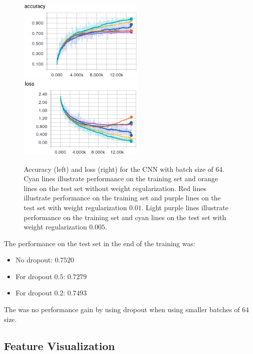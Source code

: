 \documentclass{article}
\begin{document}
\begin{figure}[h!]
\centering
\includegraphics[height=4.0cm]{acc-linear-64-drop.png}\
\includegraphics[height=4.0cm]{loss-linear-64-drop.png}
\caption{Accuracy (left) and loss (right) for the CNN with batch size of $64$. Cyan lines illustrate performance on the training set and orange lines on the test set without weight regularization. Red lines illustrate performance on the training set and purple lines on the test set with weight regularization $0.01$. Light purple lines illustrate performance on the training set and cyan lines on the test set with weight regularization $0.005$.}
\label{fig:6}
\end{figure}

The performance on the test set in the end of the training was:
\begin{itemize}
\item No dropout: $0.7520$
\item For dropout $0.5$: $0.7279$
\item For dropout $0.2$: $0.7493$
\end{itemize}
The was no performance gain by using dropout when using smaller batches of $64$ size.


\subsection{Feature Visualization}
\end{document}
